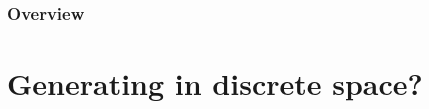 \documentclass{beamer}
\begin{document}





\begin{frame}
\frametitle{Overview} %
\tableofcontents %
\end{frame}

\section{Generating in discrete space?}
\end{document}
